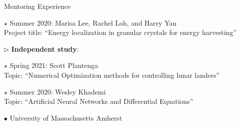 \documentclass[10pt]{article} %
\newenvironment{outerlist}[1][\enskip\textbullet]%
        {\begin{itemize}[#1]}{\end{itemize}%
         \vspace{-.6\baselineskip}}
\newenvironment{innerlist}[1][\enskip\textbullet]%
        {\begin{compactitem}[#1]}{\end{compactitem}}
\begin{document}
\begin{section}{Mentoring Experience}
\begin{outerlist}
\begin{innerlist}
\begin{innerlist}
\item[$\star$] Summer 2020: Marisa Lee, Rachel Loh, and Harry Yan \\
Project title: ``Energy localization in granular crystals for energy harvesting''
\end{innerlist}
\item[$\triangleright$] \textbf{Independent study}:
\begin{innerlist}
\item[$\star$] Spring 2021: Scott Plantenga \\
Topic: ``Numerical Optimization methods for controlling lunar landers''
\item[$\star$] Summer 2020: Wesley Khademi \\
Topic: ``Artificial Neural Networks and Differential Equations''
\end{innerlist}
\end{innerlist}


\item[$\bullet$] University of Massachusetts Amherst

\begin{innerlist}


\end{innerlist}
\end{outerlist}
\end{section}
\end{document}
